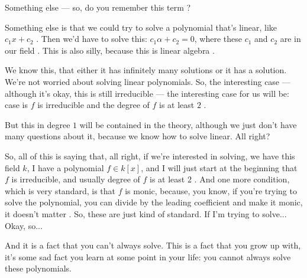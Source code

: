 \begin{speech}[00:52:35 - 00:53:36]
Something else --- so, do you remember this term ?

Something else is that we could try to solve a polynomial that's linear, like $c_1 x + c_2$ . Then we'd have to solve this: $c_1 \alpha + c_2 = 0$, where these $c_1$ and $c_2$ are in our field . This is also silly, because this is linear algebra .

We know this, that either it has infinitely many solutions or it has a solution. We're not worried about solving linear polynomials. So, the interesting case --- although it's okay, this is still irreducible  --- the interesting case for us will be: case is $f$ is irreducible and the degree of $f$ is at least $2$ .

But this  in degree $1$ will be contained in the theory, although we just don't have many questions about it, because we know how to solve linear. All right?
\end{speech}

\begin{speech}[00:53:36 - 00:54:37]
So, all of this is saying that, all right, if we're interested in solving, we have this field $k$, I have a polynomial $f \in k[x]$, and I will just start at the beginning that $f$ is irreducible, and usually degree of $f$ is at least $2$ . And one more condition, which is very standard, is that $f$ is monic, because, you know, if you're trying to solve the polynomial, you can divide by the leading coefficient and make it monic, it doesn't matter . So, these are just kind of standard. If I'm trying to solve... Okay, so...

And it is a fact that you can't always solve. This is a fact that you grow up with, it's some sad fact you learn at some point in your life: you cannot always solve these polynomials.
\end{speech}

